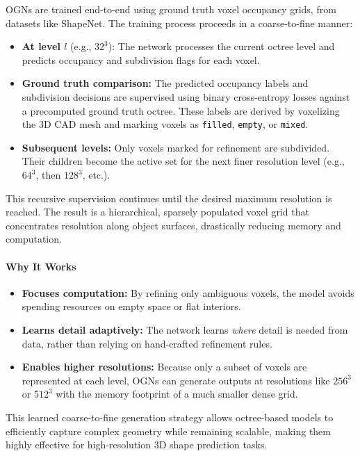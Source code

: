 OGNs are trained end-to-end using ground truth voxel occupancy grids, from datasets like ShapeNet. The training process proceeds in a coarse-to-fine manner:

\begin{itemize}
    \item \textbf{At level \(l\)} (e.g., \(32^3\)): The network processes the current octree level and predicts occupancy and subdivision flags for each voxel.
    \item \textbf{Ground truth comparison:} The predicted occupancy labels and subdivision decisions are supervised using binary cross-entropy losses against a precomputed ground truth octree. These labels are derived by voxelizing the 3D CAD mesh and marking voxels as \texttt{filled}, \texttt{empty}, or \texttt{mixed}.
    \item \textbf{Subsequent levels:} Only voxels marked for refinement are subdivided. Their children become the active set for the next finer resolution level (e.g., \(64^3\), then \(128^3\), etc.).
\end{itemize}

This recursive supervision continues until the desired maximum resolution is reached. The result is a hierarchical, sparsely populated voxel grid that concentrates resolution along object surfaces, drastically reducing memory and computation.

\paragraph{Why It Works}

\begin{itemize}
    \item \textbf{Focuses computation:} By refining only ambiguous voxels, the model avoids spending resources on empty space or flat interiors.
    \item \textbf{Learns detail adaptively:} The network learns \emph{where} detail is needed from data, rather than relying on hand-crafted refinement rules.
    \item \textbf{Enables higher resolutions:} Because only a subset of voxels are represented at each level, OGNs can generate outputs at resolutions like \(256^3\) or \(512^3\) with the memory footprint of a much smaller dense grid.
\end{itemize}

This learned coarse-to-fine generation strategy allows octree-based models to efficiently capture complex geometry while remaining scalable, making them highly effective for high-resolution 3D shape prediction tasks.

